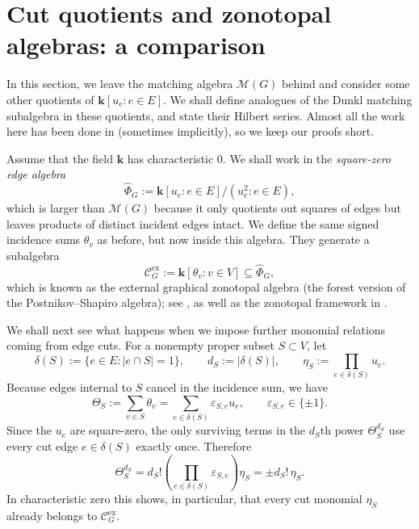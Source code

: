 \documentclass[12pt]{amsart}
\theoremstyle{definition}
\theoremstyle{remark}
\newcommand{\kk}{\mathbf{k}}
\begin{document}
\appendix

\section{Cut quotients and zonotopal algebras: a comparison}\label{sec:cut-quotients}

In this section, we leave the matching algebra $\mathcal M(G)$
behind and consider some other quotients of
$\kk[u_e : e \in E]$.
We shall define analogues of the Dunkl matching subalgebra in
these quotients, and state their Hilbert series.
Almost all the work here has been done in \cite{PS}
(sometimes implicitly), so we keep our proofs short.

Assume that the field $\kk$ has characteristic $0$.
We shall work in the \emph{square-zero edge
algebra}
\[
 \widehat\Phi_G:=\kk[u_e:e\in E]/(u_e^2:e\in E),
\]
which is larger than $\mathcal M(G)$ because it only
quotients out squares of edges but leaves
products of distinct incident edges intact.
We define the same
signed incidence sums $\theta_v$ as before, but now inside this algebra.
They generate a subalgebra
\[
 \mathcal C_G^{\mathrm{ex}}:=\kk[\theta_v:v\in V]\subseteq\widehat\Phi_G,
\]
which is known as
the external graphical zonotopal algebra (the forest version of the
Postnikov--Shapiro algebra); see \cite[\S11]{PS}, as well as the zonotopal
framework in \cite{AP,HR}.

We shall next see what happens when we impose further
monomial relations coming from edge cuts.
For a nonempty proper subset $S\subset V$, let
\[
 \delta(S):=\{e\in E:|e\cap S|=1\},
 \qquad
 d_S:=|\delta(S)|,
 \qquad
 \eta_S:=\prod_{e\in\delta(S)}u_e.
\]
Because edges internal to $S$ cancel in the incidence sum,
we have
\begin{equation}\label{eq:cut-sum}
 \Theta_S:=\sum_{v\in S}\theta_v
 =\sum_{e\in\delta(S)}\varepsilon_{S,e}u_e,
 \qquad \varepsilon_{S,e}\in\{\pm1\}.
\end{equation}
Since the $u_e$ are square-zero, the only surviving terms in the
$d_S$th power $\Theta_S^{d_S}$
use every cut edge $e \in \delta(S)$ exactly once.  Therefore
\begin{equation}\label{eq:cut-power}
 \Theta_S^{d_S}
 =d_S!\left(\prod_{e\in\delta(S)}\varepsilon_{S,e}\right)\eta_S
 =\pm d_S!\,\eta_S.
\end{equation}
In characteristic zero this shows, in particular, that every cut monomial
$\eta_S$ already belongs to $\mathcal C_G^{\mathrm{ex}}$.
\end{document}
